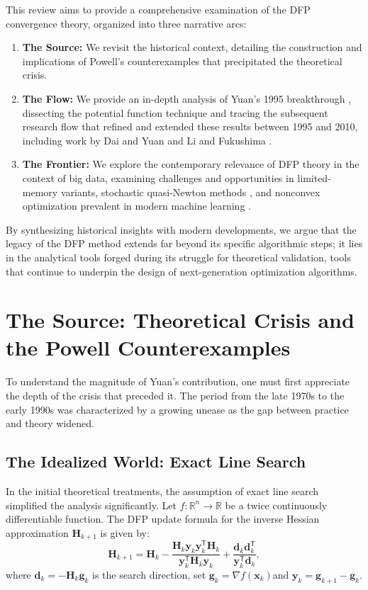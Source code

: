 \documentclass[12pt,a4paper]{article}  %
\newcounter{cite}
\theoremstyle{definition}
\numberwithin{equation}{section}
\newcommand{\RR}{\mathbb{R}}
\newcommand{\HH}{\bm{H}}
\newcommand{\yy}{\bm{y}}
\newcommand{\trans}{{\scriptstyle{\mathsf{T}}}}
\newcommand{\dd}{\mathbf{d}}
\newcommand{\xx}{\mathbf{x}}
\renewcommand{\ggg}{\mathbf{g}}
\begin{document}
This review aims to provide a comprehensive examination of the DFP convergence theory, organized into three narrative arcs:
\begin{enumerate}
    \item \textbf{The Source:} We revisit the historical context, detailing the construction and implications of Powell's counterexamples \cite{powell1984,powell1986} that precipitated the theoretical crisis.
    \item \textbf{The Flow:} We provide an in-depth analysis of Yuan's 1995 breakthrough \cite{yuan1995}, dissecting the potential function technique and tracing the subsequent research flow that refined and extended these results between 1995 and 2010, including work by Dai and Yuan \cite{dai2003} and Li and Fukushima \cite{li2001}.
    \item \textbf{The Frontier:} We explore the contemporary relevance of DFP theory in the context of big data, examining challenges and opportunities in limited-memory variants, stochastic quasi-Newton methods \cite{byrd2016,moritz2016}, and nonconvex optimization prevalent in modern machine learning \cite{li2001}.
\end{enumerate}

By synthesizing historical insights with modern developments, we argue that the legacy of the DFP method extends far beyond its specific algorithmic steps; it lies in the analytical tools forged during its struggle for theoretical validation, tools that continue to underpin the design of next-generation optimization algorithms.

\section{The Source: Theoretical Crisis and the Powell Counterexamples}
\label{sec:source}

To understand the magnitude of Yuan's contribution, one must first appreciate the depth of the crisis that preceded it. The period from the late 1970s to the early 1990s was characterized by a growing unease as the gap between practice and theory widened.

\subsection{The Idealized World: Exact Line Search}
In the initial theoretical treatments, the assumption of exact line search simplified the analysis significantly. Let $f: \RR^n \to \RR$ be a twice continuously differentiable function. The DFP update formula for the inverse Hessian approximation $\HH_{k+1}$ is given by:
\begin{equation}
    \HH_{k+1} = \HH_k - \frac{\HH_k \yy_k \yy_k^\trans \HH_k}{\yy_k^\trans \HH_k \yy_k} + \frac{\dd_k \dd_k^\trans}{\yy_k^\trans \dd_k},
    \label{eq:dfp_update}
\end{equation}
where $\dd_k = -\HH_k \ggg_k$ is the search direction, set $\ggg_k = \nabla f(\xx_k)$and $\yy_k = \ggg_{k+1} - \ggg_k$.
\end{document}
